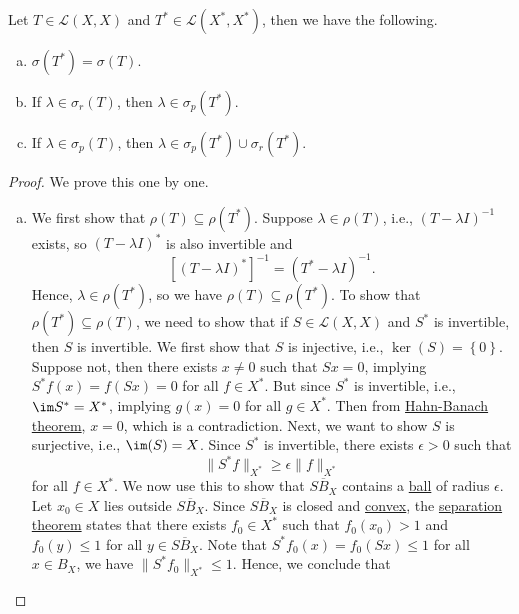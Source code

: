 \begin{theorem}\label{thm:lec21}
	Let \(T\in \mathcal{L} (X, X)\) and \(T^{\ast} \in \mathcal{L} (X^{\ast} , X^{\ast} )\), then we have the following.
	\begin{enumerate}[(a)]
		\item \(\sigma (T^{\ast} ) = \sigma (T)\).
		\item If \(\lambda \in \sigma _r(T)\), then \(\lambda \in \sigma _p(T^{\ast} )\).
		\item If \(\lambda \in \sigma _p(T)\), then \(\lambda \in \sigma _p(T^{\ast} ) \cup \sigma _r(T^{\ast} )\).
	\end{enumerate}
\end{theorem}
\begin{proof}\let\qed\relax
	We prove this one by one.
	\begin{enumerate}[(a)]
		\item We first show that \(\rho (T) \subseteq \rho (T^{\ast})\). Suppose \(\lambda \in \rho (T)\), i.e., \((T-\lambda I)^{-1} \) exists, so \((T - \lambda I)^{\ast} \) is also invertible and
		      \[
			      \left[ (T-\lambda I)^{\ast} \right]^{-1} = (T^{\ast} - \lambda I)^{-1}.
		      \]
		      Hence, \(\lambda \in \rho (T^{\ast} )\), so we have \(\rho (T) \subseteq \rho (T^{\ast})\). To show that \(\rho (T^{\ast}) \subseteq \rho (T)\), we need to show that if \(S\in \mathcal{L} (X, X)\) and \(S^{\ast} \) is invertible, then \(S\) is invertible. We first show that \(S\) is injective, i.e., \(\ker(S)= \left\{ 0 \right\} \). Suppose not, then there exists \(x \neq 0\) such that \(Sx = 0\), implying \(S^{\ast} f(x) = f(Sx) = 0\) for all \(f\in X^{\ast} \). But since \(S^{\ast} \) is invertible, i.e., \(\im S^{\ast} = X^{\ast} \), implying \(g(x) = 0\) for all \(g\in X^{\ast} \). Then from \hyperref[thm:Hahn-Banach]{Hahn-Banach theorem}, \(x = 0\), which is a contradiction. Next, we want to show \(S\) is surjective, i.e., \(\im(S) = X\). Since \(S^{\ast} \) is invertible, there exists \(\epsilon >0\) such that
		      \[
			      \lVert S^{\ast} f \rVert _{X^{\ast} }\geq \epsilon \lVert f \rVert _{X^{\ast}}
		      \]
		      for all \(f\in X^{\ast} \). We now use this to show that \(\overline{SB_X}\) contains a \hyperref[def:ball]{ball} of radius \(\epsilon \). Let \(x_0\in X\) lies outside \(\overline{SB_X}\). Since \(\overline{SB_X}\) is closed and \hyperref[def:convex-set]{convex}, the \hyperref[thm:separation-of-a-point-from-a-convex-set]{separation theorem} states that there exists \(f_0\in X^{\ast} \) such that \(f_0(x_0)>1\) and \(f_0(y) \leq 1\) for all \(y\in \overline{SB_X}\). Note that \(S^{\ast} f_0(x) = f_0(Sx) \leq 1\) for all \(x\in B_X\), we have \(\lVert S^{\ast} f_0 \rVert_{X^{\ast} }\leq 1 \). Hence, we conclude that

\end{enumerate}
\end{proof}
